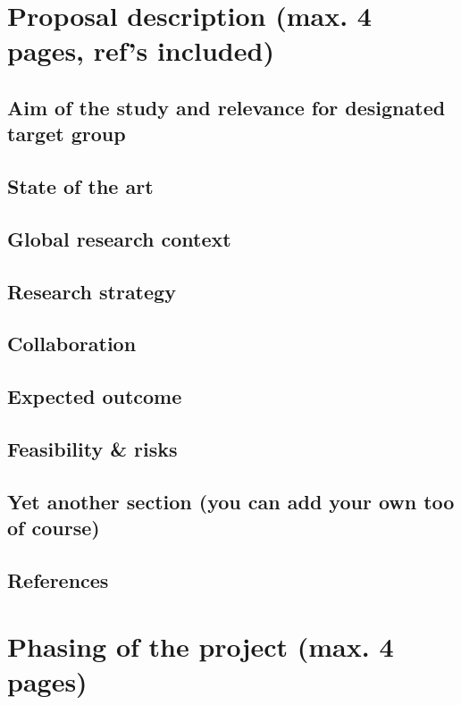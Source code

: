 \section{Proposal description (max. 4 pages, ref's included)}
\subsection{Aim of the study and relevance for designated target group}
\subsection{State of the art}
\subsection{Global research context}
\subsection{Research strategy}
\subsection{Collaboration}
\subsection{Expected outcome}
\subsection{Feasibility \& risks}
\subsection{Yet another section (you can add your own too of course)}
\subsection{References}

\section{Phasing of the project (max. 4 pages)}

